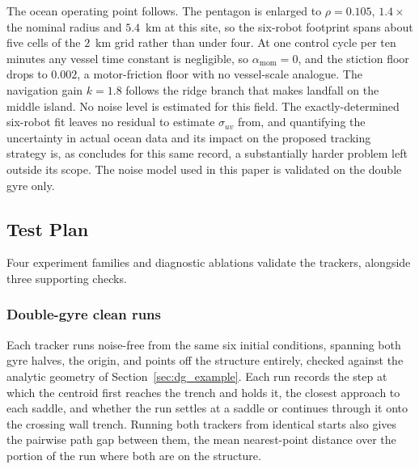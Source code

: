 \documentclass[lettersize,journal]{IEEEtran}
\begin{document}
The ocean operating point follows. The pentagon is enlarged to $\rho = 0.105$,
$1.4\times$ the nominal radius and $5.4$~km at this site, so the
six-robot footprint spans about five cells of the $2$~km grid rather
than under four. At one control cycle per ten minutes any vessel time
constant is negligible, so $\alpha_{\text{mom}} = 0$, and the stiction
floor drops to $0.002$, a motor-friction floor with no vessel-scale
analogue. The navigation gain $k = 1.8$ follows the ridge branch that
makes landfall on the middle island. No noise level is estimated
for this field. The exactly-determined six-robot fit leaves no residual
to estimate $\sigma_{uv}$ from, and quantifying the uncertainty in
actual ocean data and its impact on the proposed tracking strategy is,
as \cite{17} concludes for this same record, a substantially harder
problem left outside its scope. The noise model used in this paper is
validated on the double gyre only.

\subsection{Test Plan}
\label{sec:test_plan}

Four experiment families and diagnostic ablations validate the trackers, alongside three
supporting checks.

\subsubsection{Double-gyre clean runs}
Each tracker runs noise-free from the same six initial conditions,
spanning both gyre halves, the origin, and points off the structure
entirely, checked against the analytic geometry of Section~\ref{sec:dg_example}. Each
run records the step at which the
centroid first reaches the trench and holds it, the closest approach to
each saddle, and whether the run settles at a saddle or continues
through it onto the crossing wall trench. Running both trackers from
identical starts also gives the pairwise path gap between them, the mean
nearest-point distance over the portion of the run where both are on the
structure.
\end{document}
